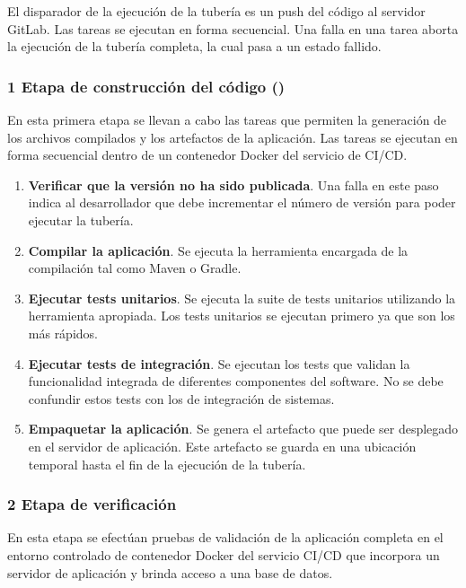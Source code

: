 El disparador de la ejecución de la tubería es un push del código al
servidor GitLab. Las tareas se ejecutan en forma secuencial. Una falla
en una tarea aborta la ejecución de la tubería completa, la cual pasa
a un estado fallido.

\subsubsection{1 Etapa de construcción del código ()}

En esta primera etapa se llevan a cabo las tareas que permiten la
generación de los archivos compilados y los artefactos de la
aplicación. Las tareas se ejecutan en forma secuencial dentro de un
contenedor Docker del servicio de CI/CD.

\begin{enumerate}
\item \textbf{Verificar que la versión no ha sido publicada}. Una
  falla en este paso indica al desarrollador que debe incrementar el
  número de versión para poder ejecutar la tubería.
\item \textbf{Compilar la aplicación}. Se ejecuta la herramienta
  encargada de la compilación tal como Maven o Gradle.
\item \textbf{Ejecutar tests unitarios}. Se ejecuta la suite de tests
  unitarios utilizando la herramienta apropiada. Los tests unitarios
  se ejecutan primero ya que son los más rápidos.
\item \textbf{Ejecutar tests de integración}. Se ejecutan los tests
  que validan la funcionalidad integrada de diferentes componentes del
  software. No se debe confundir estos tests con los de integración de
  sistemas.
\item \textbf{Empaquetar la aplicación}. Se genera el artefacto que
  puede ser desplegado en el servidor de aplicación. Este artefacto se
  guarda en una ubicación temporal hasta el fin de la ejecución de la
  tubería.
\end{enumerate}
\subsubsection{2 Etapa de verificación}

En esta etapa se efectúan pruebas de validación de la aplicación
completa en el entorno controlado de contenedor Docker del servicio
CI/CD que incorpora un servidor de aplicación y brinda acceso a una
base de datos.


